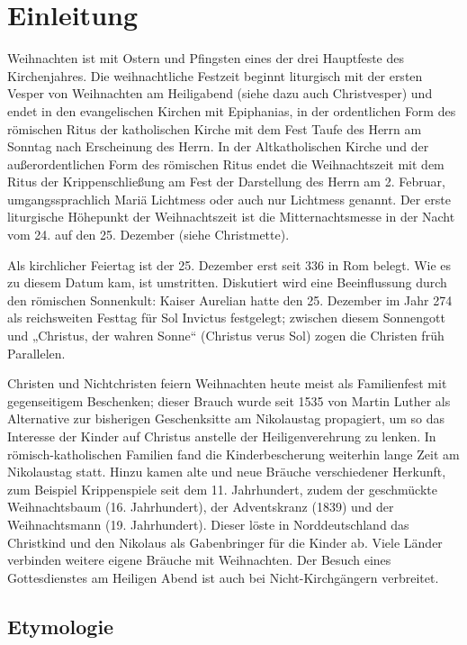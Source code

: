 
\chapter{Einleitung}
Weihnachten ist mit Ostern und Pfingsten eines der drei Hauptfeste des Kirchenjahres. Die weihnachtliche Festzeit beginnt liturgisch mit der ersten Vesper von Weihnachten am Heiligabend (siehe dazu auch Christvesper) und endet in den evangelischen Kirchen mit Epiphanias, in der ordentlichen Form des römischen Ritus der katholischen Kirche mit dem Fest Taufe des Herrn am Sonntag nach Erscheinung des Herrn. In der Altkatholischen Kirche und der außerordentlichen Form des römischen Ritus endet die Weihnachtszeit mit dem Ritus der Krippenschließung am Fest der Darstellung des Herrn am 2. Februar, umgangssprachlich Mariä Lichtmess oder auch nur Lichtmess genannt. Der erste liturgische Höhepunkt der Weihnachtszeit ist die Mitternachtsmesse in der Nacht vom 24. auf den 25. Dezember (siehe Christmette).

Als kirchlicher Feiertag ist der 25. Dezember erst seit 336 in Rom belegt. Wie es zu diesem Datum kam, ist umstritten. Diskutiert wird eine Beeinflussung durch den römischen Sonnenkult: Kaiser Aurelian hatte den 25. Dezember im Jahr 274 als reichsweiten Festtag für Sol Invictus festgelegt; zwischen diesem Sonnengott und „Christus, der wahren Sonne“ (Christus verus Sol) zogen die Christen früh Parallelen.

Christen und Nichtchristen feiern Weihnachten heute meist als Familienfest mit gegenseitigem Beschenken; dieser Brauch wurde seit 1535 von Martin Luther als Alternative zur bisherigen Geschenksitte am Nikolaustag propagiert, um so das Interesse der Kinder auf Christus anstelle der Heiligenverehrung zu lenken. In römisch-katholischen Familien fand die Kinderbescherung weiterhin lange Zeit am Nikolaustag statt. Hinzu kamen alte und neue Bräuche verschiedener Herkunft, zum Beispiel Krippenspiele seit dem 11. Jahrhundert, zudem der geschmückte Weihnachtsbaum (16. Jahrhundert), der Adventskranz (1839) und der Weihnachtsmann (19. Jahrhundert). Dieser löste in Norddeutschland das Christkind und den Nikolaus als Gabenbringer für die Kinder ab. Viele Länder verbinden weitere eigene Bräuche mit Weihnachten. Der Besuch eines Gottesdienstes am Heiligen Abend ist auch bei Nicht-Kirchgängern verbreitet.


\section{Etymologie}

